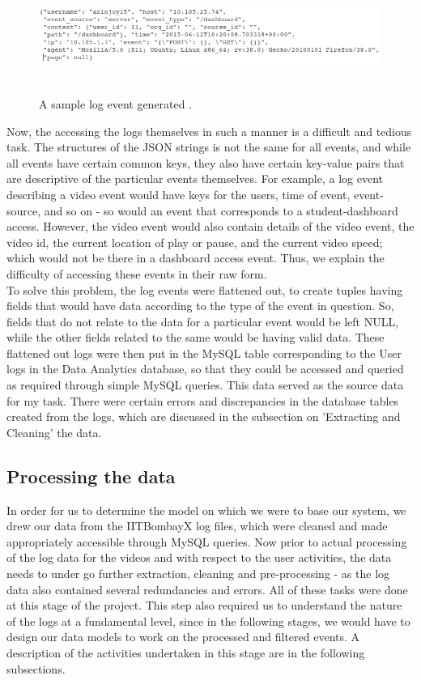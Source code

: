 \documentclass[16pt]{report}
\begin{document}
\begin{figure}[H]
\centering
\includegraphics[height=3cm]{Diag1.png}\\ %
\caption{A sample log event generated \label{fig:Image1}.}
\end{figure}

Now, the accessing the logs themselves in such a manner is a difficult and tedious task. The structures of the JSON strings is not the same for all events, and while all events have certain common keys, they also have certain key-value pairs that are descriptive of the particular events themselves. For example, a log event describing a video event would have keys for the users, time of event, event-source, and so on - so would an event that corresponds to a student-dashboard access. However, the video event would also contain details of the video event, the video id, the current location of play or pause, and the current video speed; which would  not be there in a dashboard access event. Thus, we explain the difficulty of accessing these events in their raw form.\\

To solve this problem, the log events were flattened out, to create tuples having fields that would have data according to the type of the event in question. So, fields that do not relate to the data for a particular event would be left NULL, while the other fields related to the same would be having valid data. These flattened out logs were then put in the MySQL table corresponding to the User logs in the Data Analytics database, so that they could be accessed and queried as required through simple MySQL queries. This data served as the source data for my task. There were certain errors and discrepancies in the database tables created from the logs, which are discussed in the subsection on 'Extracting and Cleaning' the data.

\subsection{Processing the data}

In order for us to determine the model on which we were to base our system, we drew our data from the  IITBombayX log files, which were cleaned and made appropriately accessible through MySQL queries. Now prior to actual processing of the log data for the videos and with respect to the user activities, the data needs to under go further extraction, cleaning and pre-processing - as the log data also contained several redundancies and errors. All of these tasks were done at this stage of the project. This step also required us to understand the nature of the logs at a fundamental level, since in the following stages, we would have to design our data models to work on the processed and filtered events. A description of the activities undertaken in this stage are in the following subsections.
\end{document}
